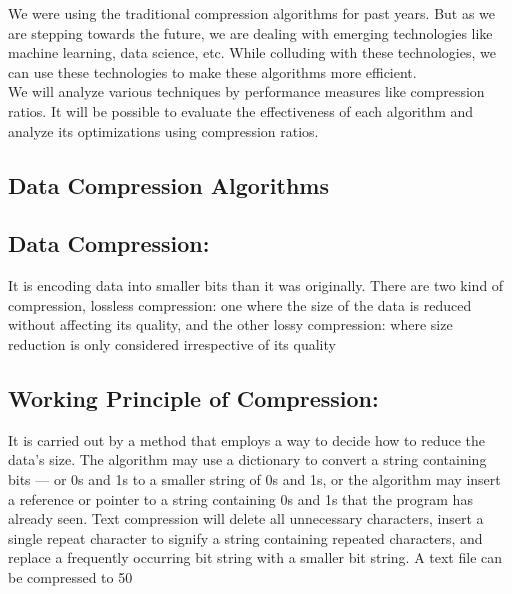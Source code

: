 \documentclass[a4paper, 12pt]{article}
\begin{document}
\hspace{1.5cm} We were using the traditional compression algorithms for past years. But as we are stepping towards the future, we are dealing with emerging technologies like machine learning, data science, etc. While colluding with these technologies, we can use these technologies to make these algorithms more efficient.\\

\hspace{1.5cm}We will analyze various techniques by performance measures like compression ratios. It will be possible to evaluate the effectiveness of each algorithm and analyze its optimizations using compression ratios.

\newpage
\begin{center}
\section{Data Compression Algorithms}
\end{center}
\subsection{Data Compression:}
\par
\hspace{1cm}It is encoding data into smaller bits than it was originally. There are two kind of compression, lossless compression: one where the size of the data is reduced without affecting its quality, and the other lossy compression: where size reduction is only considered irrespective of its quality
\\
\subsection{Working Principle of Compression:}
\par
\hspace{1cm}It is carried out by a method that employs a way to decide how to reduce the data's size. The algorithm may use a dictionary to convert a string containing bits — or 0s and 1s to a smaller string of 0s and 1s, or the algorithm may insert a reference or pointer to a string containing 0s and 1s that the program has already seen. Text compression will delete all unnecessary characters, insert a single repeat character to signify a string 
containing repeated characters, and replace a frequently occurring bit string with a smaller bit string. A text file can be compressed to 50%
\\
\end{document}
